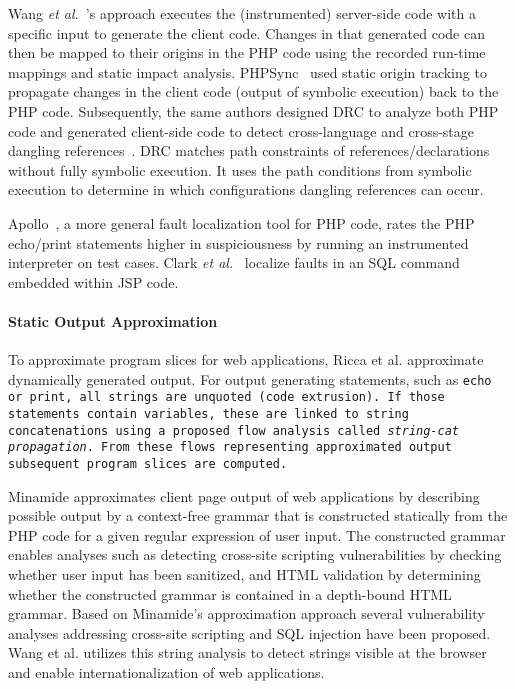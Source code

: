 Wang {\em et al.}~\cite{wang-fse12}'s approach executes the
(instrumented) server-side code with a specific input to generate the
client code. Changes in that generated code can then be mapped to
their origins in the PHP code using the recorded run-time mappings and
static impact analysis.
%
PHPSync~\cite{phpsync} used static origin tracking to propagate
changes in the client code (output of symbolic execution) back to the
PHP code. Subsequently, the same authors designed DRC to analyze both
PHP code and generated client-side code to detect cross-language and
cross-stage dangling references~\cite{drc-ase13}. DRC matches path
constraints of references/declarations without fully symbolic
execution. It uses the path conditions from symbolic execution to
determine in which configurations dangling references can occur.

Apollo~\cite{artzi-icse10,artzi-tse10}, a more general fault
localization tool for PHP code, rates the PHP echo/print
statements higher in suspiciousness by running an instrumented
interpreter on test cases. Clark {\em et al.}~\cite{clark-ase11}
localize faults in an SQL command embedded within JSP code. 



\paragraph{Static Output Approximation}
To approximate program slices for web applications, Ricca et
al. \cite{tonella_web_2005,tonella_2001,tonella_2002} approximate
dynamically generated output. For output generating statements, such
as \tt{echo} or \tt{print}, all strings are unquoted (code
extrusion). If those statements contain variables, these are linked to
string concatenations using a proposed flow analysis called
\emph{string-cat propagation}. From these flows representing
approximated output subsequent program slices are computed.

Minamide \cite{minamide_static_2005} approximates client page output
of web applications by describing possible output by a context-free
grammar that is constructed statically from the PHP code for a given regular
expression of user input. The constructed grammar enables analyses such as
detecting cross-site scripting vulnerabilities by checking whether user input
has been sanitized, and HTML validation by determining whether the constructed
grammar is contained in a depth-bound HTML grammar. Based on Minamide's
approximation approach several vulnerability analyses addressing cross-site
scripting \cite{wassermann_static_2008} and SQL injection
\cite{wassermann2007sound} have been proposed. Wang et al.
\cite{wang_locating_2010} utilizes this string analysis to detect strings
visible at the browser and enable internationalization of web applications.
    

